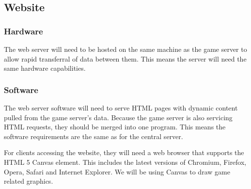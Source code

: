 	\subsection{Website}
		\subsubsection{Hardware}
			The web server will need to be hosted on the same machine as the
			game server to allow rapid transferral of data between them. This
			means the server will need the same hardware capabilities.

		\subsubsection{Software}
			The web server software will need to serve HTML pages with dynamic
			content pulled from the game server's data. Because the game server
			is also servicing HTML requests, they should be merged into one
			program. This means the software requirements are the same as for
			the central server.

			For clients accessing the website, they will need a web browser
			that supports the HTML 5 Canvas element. This includes the latest
			versions of Chromium, Firefox, Opera, Safari and Internet Explorer.
			We will be using Canvas to draw game related graphics.
